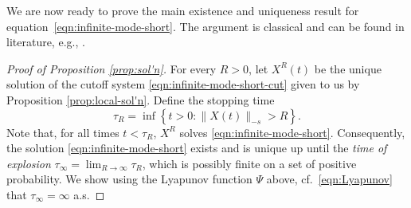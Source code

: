 \documentclass[11pt]{amsart}
\theoremstyle{definition}
\theoremstyle{definition}
\theoremstyle{plain}
\numberwithin{equation}{section}
\begin{document}
We are now ready to prove the main existence and uniqueness result for equation~\eqref{eqn:infinite-mode-short}. The argument is classical and can be found in literature, e.g.,  \cite{albeverio2008spde,glatt2009strong,jacod2006calcul}.

\begin{proof}[Proof of Proposition \ref{prop:sol'n}] For every $R>0$, let $X^R(t)$ be the unique solution of the cutoff system \eqref{eqn:infinite-mode-short-cut} given to us by Proposition \ref{prop:local-sol'n}. Define the stopping time 
\[\tau_R=\inf\left\{t>0: \|X(t)\|_{-s}>R\right\}.\]
Note that, for all times $t< \tau_R$, $X^R$ solves \eqref{eqn:infinite-mode-short}. Consequently, the solution \eqref{eqn:infinite-mode-short} exists and is unique up until the \emph{time of explosion} $\tau_\infty=\lim_{R\to\infty}\tau_R$, which is possibly finite on a set of positive probability. We show using the Lyapunov function $\Psi$ above, cf.~\eqref{eqn:Lyapunov} that $\tau_\infty=\infty$ a.s.


\end{proof}
\end{document}
